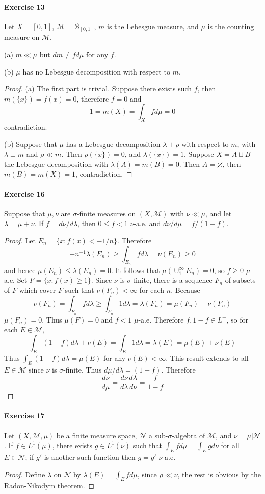 \paragraph*{Exercise 13}
Let $X=[0,1]$, $\mathcal{M}=\mathcal{B}_{[0,1]}$, $m$ is the Lebesgue measure, and $\mu$ is the counting measure on $\mathcal{M}$.
\par(a) $m\ll\mu$ but $dm\neq fd\mu$ for any $f$.
\par(b) $\mu$ has no Lebesgue decomposition with respect to $m$.
\begin{proof}
    (a) The first part is trivial. Suppose there exists such $f$, then $m(\{x\})=f(x)=0$, therefore $f=0$ and
    $$
    1=m(X)=\int_Xfd\mu=0
    $$
    contradiction.
    \par (b) Suppose that $\mu$ has a Lebesgue decomposition $\lambda+\rho$ with respect to $m$, with $\lambda\perp m$ and $\rho\ll m$. Then $\rho(\{x\})=0$, and $\lambda(\{x\})=1$. Suppose $X=A\sqcup B$ the Lebesgue decomposition with $\lambda(A)=m(B)=0$. Then $A=\varnothing$, then $m(B)=m(X)=1$, contradiction.
\end{proof}
\paragraph*{Exercise 16}
Suppose that $\mu,\nu$ are $\sigma$-finite measures on $(X,\mathcal{M})$ with $\nu\ll\mu$, and let $\lambda=\mu+\nu$. If $f=d\nu/d\lambda$, then $0\le f<1$ $\nu$-a.e. and $d\nu/d\mu=f/(1-f)$.
\begin{proof}
    Let $E_n=\{x:f(x)<-1/n\}$. Therefore
    $$
    -n^{-1}\lambda(E_n)\ge\int_{E_n}fd\lambda=\nu(E_n)\ge 0
    $$
    and hence $\mu(E_n)\le\lambda(E_n)=0$. It follows that $\mu(\cup^\infty_1E_n)=0$, so $f\ge 0$ $\mu$-a.e. Set $F=\{x:f(x)\ge 1\}$. Since $\nu$ is $\sigma$-finite, there is a sequence $F_n$ of subsets of $F$ which cover $F$ such that $\nu(F_n)<\infty$ for each $n$. Because
    $$
    \nu(F_n)=\int_{F_n}fd\lambda\ge\int_{F_n}1d\lambda=\lambda(F_n)=\mu(F_n)+\nu(F_n)
    $$
    $\mu(F_n)=0$. Thus $\mu(F)=0$ and $f<1$ $\mu$-a.e. Therefore $f,1-f\in L^+$, so for each $E\in\mathcal{M}$,
    $$
    \int_E(1-f)d\lambda+\nu(E)=\int_E1d\lambda=\lambda(E)=\mu(E)+\nu(E)
    $$
    Thus $\int_E(1-f)d\lambda=\mu(E)$ for any $\nu(E)<\infty$. This result extends to all $E\in\mathcal{M}$ since $\nu$ is $\sigma$-finite. Thus $d\mu/d\lambda=(1-f)$. Therefore
    $$
    \dfrac{d\nu}{d\mu}=\dfrac{d\nu}{d\lambda}\dfrac{d\lambda}{d\nu}=\dfrac{f}{1-f}
    $$
\end{proof}
\paragraph*{Exercise 17}
Let $(X,\mathcal{M},\mu)$ be a finite measure space, $\mathcal{N}$ a sub-$\sigma$-algebra of $\mathcal{M}$, and $\nu=\mu|\mathcal{N}$. If $f\in L^1(\mu)$, there exists $g\in L^1(\nu)$ such that $\int_Efd\mu=\int_Egd\nu$ for all $E\in\mathcal{N}$; if $g'$ is another such function then $g=g'$ $\nu$-a.e.
\begin{proof}
    Define $\lambda$ on $\mathcal{N}$ by $\lambda(E)=\int_Efd\mu$, since $\rho\ll\nu$, the rest is obvious by the Radon-Nikodym theorem.
\end{proof}
